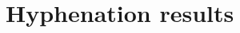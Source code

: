 \documentclass{article}
\newcommand{\cmark}{\ding{51}}%
\newcommand{\xmark}{\ding{55}}%
\begin{document}
%
%
%    
%
%
%    
%

\printbibliography

\appendix
\section{Hyphenation results}

\end{document}
